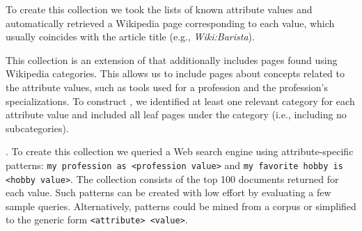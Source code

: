 To create this collection we took the lists of known attribute values and 
automatically retrieved
a Wikipedia page corresponding to each value, which usually coincides with the article title (e.g., \textit{Wiki:Barista}).

This collection is an extension of  that additionally includes pages found using Wikipedia categories.
This allows us to include pages about concepts related to the attribute values, such as tools used for a profession and the profession's specializations.
To construct , we identified at least one relevant category for each attribute value and included all leaf pages under the category (i.e., including no subcategories).

. To create this collection we queried a Web search engine using attribute-specific patterns: \texttt{my profession as <profession value>} and \texttt{my favorite hobby is <hobby value>}.
The collection consists of the top 100 documents returned for each value.
Such patterns can be created with low effort by evaluating a few sample queries.
Alternatively, patterns could be mined from a corpus or simplified to the generic form \texttt{<attribute> <value>}.




